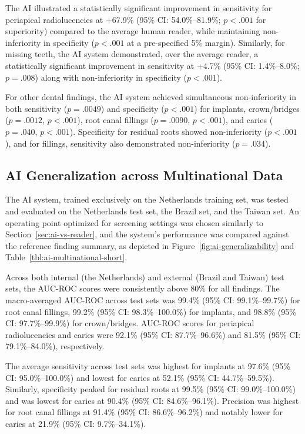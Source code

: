 The AI illustrated a statistically significant improvement in sensitivity for periapical radiolucencies at +67.9\% (95\% CI: 54.0\%--81.9\%; $p < .001$ for superiority) compared to the average human reader, while maintaining non-inferiority in specificity ($p < .001$ at a pre-specified 5\% margin).
Similarly, for missing teeth, the AI system demonstrated, over the average reader, a statistically significant improvement in sensitivity at +4.7\% (95\% CI: 1.4\%--8.0\%; $p = .008$) along with non-inferiority in specificity ($p < .001$).

For other dental findings, the AI system achieved simultaneous non-inferiority in both sensitivity ($p = .0049$) and specificity ($p < .001$) for implants, crown/bridges ($p = .0012$, $p < .001$), root canal fillings ($p = .0090$, $p < .001$), and caries ($p = .040$, $p < .001$).
Specificity for residual roots showed non-inferiority ($p < .001$), and for fillings, sensitivity also demonstrated non-inferiority ($p = .034$).

\subsection{AI Generalization across Multinational Data}
\label{sec:ai-generalizability}




The AI system, trained exclusively on the Netherlands training set, was tested and evaluated on the Netherlands test set, the Brazil set, and the Taiwan set.
An operating point optimized for screening settings was chosen similarly to Section~\ref{sec:ai-vs-reader}, and the system's performance was compared against the reference finding summary, as depicted in Figure~\ref{fig:ai-generalizability} and Table~\ref{tbl:ai-multinational-short}.

Across both internal (the Netherlands) and external (Brazil and Taiwan) test sets, the AUC-ROC scores were consistently above 80\% for all findings.
The macro-averaged AUC-ROC across test sets was 99.4\% (95\% CI: 99.1\%--99.7\%) for root canal fillings, 99.2\% (95\% CI: 98.3\%--100.0\%) for implants, and 98.8\% (95\% CI: 97.7\%--99.9\%) for crown/bridges.
AUC-ROC scores for periapical radiolucencies and caries were 92.1\% (95\% CI: 87.7\%--96.6\%) and 81.5\% (95\% CI: 79.1\%--84.0\%), respectively.

The average sensitivity across test sets was highest for implants at 97.6\% (95\% CI: 95.0\%--100.0\%) and lowest for caries at 52.1\% (95\% CI: 44.7\%--59.5\%).
Similarly, specificity peaked for residual roots at 99.5\% (95\% CI: 99.0\%--100.0\%) and was lowest for caries at 90.4\% (95\% CI: 84.6\%--96.1\%).
Precision was highest for root canal fillings at 91.4\% (95\% CI: 86.6\%--96.2\%) and notably lower for caries at 21.9\% (95\% CI: 9.7\%--34.1\%).

